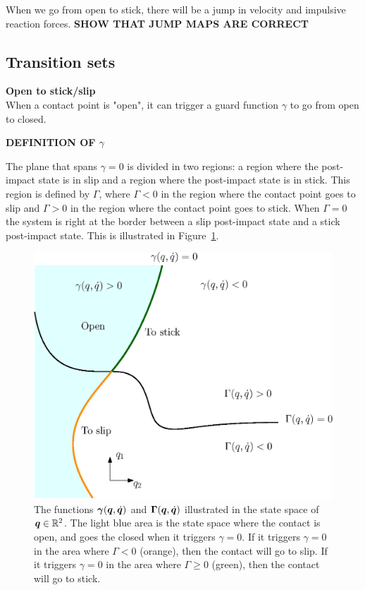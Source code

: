 \documentclass[../DC2017114Bouma.tex]{subfiles}
\begin{document}
When we go from open to stick, there will be a jump in velocity and impulsive reaction forces.
\textbf{SHOW THAT JUMP MAPS ARE CORRECT}

\subsection{Transition sets}\label{app:guards}
\textbf{Open to stick/slip}\\
When a contact point is "open", it can trigger a guard function $\gamma$ to go from open to closed.

\textbf{DEFINITION OF $\gamma$}

The plane that spans $\gamma = 0$ is divided in two regions: a region where the post-impact state is in slip and a region where the post-impact state is in stick. This region is defined by $\Gamma$, where $\Gamma<0$ in the region where the contact point goes to slip and $\Gamma > 0$ in the region where the contact point goes to stick. When $\Gamma = 0$ the system is right at the border between a slip post-impact state and a stick post-impact state. This is illustrated in Figure~\ref{fig:guardopcl}. 

\begin{figure}[H]
	\centering
	\includegraphics[width=.7\textwidth]{guardopcl.eps}\caption{The functions $\boldsymbol{\gamma}({\boldsymbol{q}},\dot{{\boldsymbol{q}}})$ and $\boldsymbol{\Gamma}({\boldsymbol{q}},\dot{{\boldsymbol{q}}})$ illustrated in the state space of ${\boldsymbol{q}}\in\mathbb{R}^{2}$. The light blue area is the state space where the contact is open, and goes the closed when it triggers $\gamma = 0$. If it triggers $\gamma = 0$ in the area where $\Gamma<0$ (orange), then the contact will go to slip. If it triggers $\gamma=0$ in the area where $\Gamma\geq 0$ (green), then the contact will go to stick.}\label{fig:guardopcl}
\end{figure}
\end{document}
